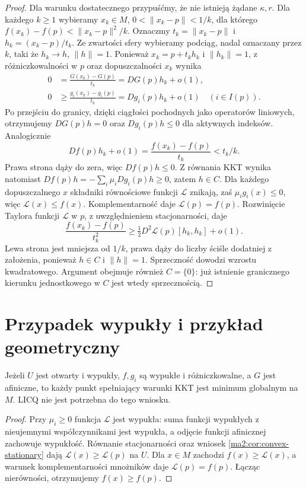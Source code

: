 \begin{proof}
Dla warunku dostatecznego przypuśćmy, że nie istnieją
żądane $\kappa,r$. Dla każdego $k\ge1$ wybieramy
$x_k\in M$, $0<\|x_k-p\|<1/k$, dla którego
$f(x_k)-f(p)<\|x_k-p\|^2/k$.
Oznaczmy $t_k=\|x_k-p\|$ i $h_k=(x_k-p)/t_k$.
Ze zwartości sfery wybieramy podciąg, nadal
oznaczany przez $k$, taki że $h_k\to h$, $\|h\|=1$.
Ponieważ $x_k=p+t_kh_k$ i $\|h_k\|=1$, z
różniczkowalności w $p$ oraz dopuszczalności $x_k$
wynika
\[
 \begin{aligned}
 0&=\frac{G(x_k)-G(p)}{t_k}=DG(p)h_k+o(1),\\
 0&\ge\frac{g_i(x_k)-g_i(p)}{t_k}
          =Dg_i(p)h_k+o(1)\quad(i\in I(p)).
 \end{aligned}
\]
Po przejściu do granicy, dzięki ciągłości pochodnych
jako operatorów liniowych, otrzymujemy $DG(p)h=0$
oraz $Dg_i(p)h\le0$ dla aktywnych indeksów.
Analogicznie
\[
 Df(p)h_k+o(1)=\frac{f(x_k)-f(p)}{t_k}<t_k/k.
\]
Prawa strona dąży do zera, więc $Df(p)h\le0$. Z równania KKT wynika natomiast
$Df(p)h=-\sum_i\mu_iDg_i(p)h\ge0$, zatem $h\in C$.
Dla każdego dopuszczalnego $x$ składniki
równościowe funkcji $\mathcal L$ znikają, zaś
$\mu_i g_i(x)\le0$, więc $\mathcal L(x)\le f(x)$.
Komplementarność daje $\mathcal L(p)=f(p)$.
Rozwinięcie Taylora funkcji $\mathcal L$ w $p$,
z uwzględnieniem stacjonarności, daje
\[
 \frac{f(x_k)-f(p)}{t_k^2}
 \ge \tfrac12 D^2\mathcal L(p)[h_k,h_k]+o(1).
\]
Lewa strona jest mniejsza od $1/k$, prawa dąży
do liczby ściśle dodatniej z założenia, ponieważ
$h\in C$ i $\|h\|=1$. Sprzeczność dowodzi
wzrostu kwadratowego. Argument obejmuje również
$C=\{0\}$: już istnienie granicznego kierunku
jednostkowego w $C$ jest wtedy sprzecznością.
\end{proof}

\section{Przypadek wypukły i przykład geometryczny}

\begin{stwierdzenie}
\label{ma2:prop:kkt-convex}
Jeżeli $U$ jest otwarty i wypukły, $f,g_i$ są
wypukłe i różniczkowalne, a $G$ jest afiniczne,
to każdy punkt spełniający warunki KKT jest
minimum globalnym na $M$. LICQ nie jest potrzebna
do tego wniosku.
\end{stwierdzenie}
\begin{proof}
Przy $\mu_i\ge0$ funkcja $\mathcal L$ jest wypukła:
suma funkcji wypukłych z nieujemnymi współczynnikami
jest wypukła, a odjęcie funkcji afinicznej
zachowuje wypukłość. Równanie stacjonarności
oraz wniosek \ref{ma2:cor:convex-stationary}
dają $\mathcal L(x)\ge\mathcal L(p)$ na $U$.
Dla $x\in M$ zachodzi $f(x)\ge\mathcal L(x)$,
a warunek komplementarności mnożników daje
$\mathcal L(p)=f(p)$. Łącząc nierówności,
otrzymujemy $f(x)\ge f(p)$.
\end{proof}

